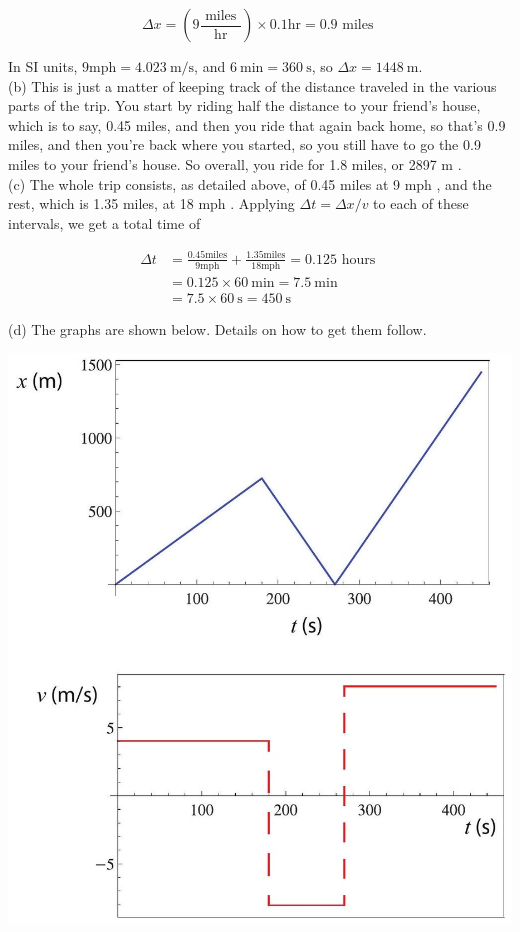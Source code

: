 \documentclass[10pt]{article}
\begin{document}
\begin{equation*}
\Delta x=\left(9 \frac{\text { miles }}{\mathrm{hr}}\right) \times 0.1 \mathrm{hr}=0.9 \text { miles } \tag{1.23}
\end{equation*}


In SI units, $9 \mathrm{mph}=4.023 \mathrm{~m} / \mathrm{s}$, and $6 \mathrm{~min}=360 \mathrm{~s}$, so $\Delta x=1448 \mathrm{~m}$.\\
(b) This is just a matter of keeping track of the distance traveled in the various parts of the trip. You start by riding half the distance to your friend's house, which is to say, 0.45 miles, and then you ride that again back home, so that's 0.9 miles, and then you're back where you started, so you still have to go the 0.9 miles to your friend's house. So overall, you ride for 1.8 miles, or 2897 m .\\
(c) The whole trip consists, as detailed above, of 0.45 miles at 9 mph , and the rest, which is 1.35 miles, at 18 mph . Applying $\Delta t=\Delta x / v$ to each of these intervals, we get a total time of


\begin{align*}
\Delta t & =\frac{0.45 \mathrm{miles}}{9 \mathrm{mph}}+\frac{1.35 \mathrm{miles}}{18 \mathrm{mph}}=0.125 \text { hours } \\
& =0.125 \times 60 \mathrm{~min}=7.5 \mathrm{~min} \\
& =7.5 \times 60 \mathrm{~s}=450 \mathrm{~s} \tag{1.24}
\end{align*}


(d) The graphs are shown below. Details on how to get them follow.

\begin{center}
\includegraphics[max width=\textwidth]{2024_09_14_9969b06773f10b6936e8g-040}
\end{center}
\end{document}
